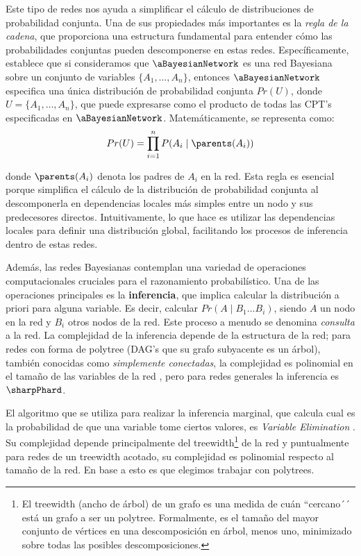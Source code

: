  
Este tipo de redes nos ayuda a simplificar el cálculo de distribuciones de probabilidad conjunta. Una de sus propiedades más importantes es la \emph{regla de la cadena}, que proporciona una estructura fundamental para entender cómo las probabilidades conjuntas pueden descomponerse en estas redes. Específicamente, establece que si consideramos que $\aBayesianNetwork$ es una red Bayesiana sobre un conjunto de variables \( \{A_1, \dots, A_n\} \), entonces $\aBayesianNetwork$ especifica una única distribución de probabilidad conjunta \( Pr(U) \), donde \( U = \{A_1, \dots, A_n\} \), que puede expresarse como el producto de todas las CPT's especificadas en $\aBayesianNetwork$. Matemáticamente, se representa como:
\begin{align}\label{eq:bayesian_probability}
    Pr(U) = \prod_{i=1}^{n} P(A_i \mid \parents(A_i))    
\end{align}

donde $\parents(A_i)$  denota los padres de \( A_i \) en la red. Esta regla es esencial porque simplifica el cálculo de la distribución de probabilidad conjunta al descomponerla en dependencias locales más simples entre un nodo y sus predecesores directos. Intuitivamente, lo que hace es utilizar las dependencias locales para definir una distribución global, facilitando los procesos de inferencia dentro de estas redes.


Además, las redes Bayesianas contemplan una variedad de operaciones computacionales cruciales para el razonamiento probabilístico. Una de las operaciones principales es la \textbf{inferencia}, que implica calcular la distribución a priori para alguna variable. Es decir, calcular $Pr(A \mid B_1  \dots B_i)$, siendo $A$ un nodo en la red y $B_i$ otros nodos de la red. Este proceso a menudo se denomina \emph{consulta} a la red. La complejidad de la inferencia depende de la estructura de la red; para redes con forma de polytree (DAG's que su grafo subyacente es un árbol), también conocidas como \emph{simplemente conectadas}, la complejidad es polinomial en el tamaño de las variables de la red \cite{pearl1986bayesianInference}, pero para redes generales la inferencia es $\sharpPhard$. 


El algoritmo que se utiliza  para realizar la inferencia marginal, que calcula cual es la probabilidad de que una variable tome ciertos valores, es \emph{Variable Elimination} \cite{variableElimination}. Su complejidad depende principalmente del treewidth\footnote{El treewidth (ancho de árbol) de un grafo es una medida de cuán ``cercano´´ está un grafo a ser un polytree. Formalmente, es el tamaño del mayor conjunto de vértices en una descomposición en árbol, menos uno, minimizado sobre todas las posibles descomposiciones.} de la red y puntualmente para redes de un treewidth acotado, su complejidad es polinomial respecto al tamaño de la red. En base a esto es que elegimos trabajar con polytrees. 

